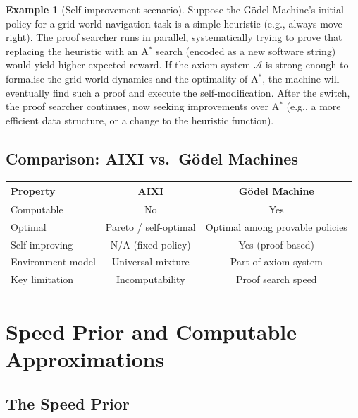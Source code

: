 \documentclass[11pt,a4paper]{article}
\theoremstyle{definition}
\newtheorem{example}[theorem]{Example}
\theoremstyle{remark}
\begin{document}
\begin{example}[Self-improvement scenario]
Suppose the G\"odel Machine's initial policy for a grid-world navigation
task is a simple heuristic (e.g., always move right).  The proof searcher
runs in parallel, systematically trying to prove that replacing the heuristic
with an A$^*$ search (encoded as a new software string) would yield higher
expected reward.  If the axiom system $\mathcal{A}$ is strong enough to
formalise the grid-world dynamics and the optimality of A$^*$, the machine
will eventually find such a proof and execute the self-modification.
After the switch, the proof searcher continues, now seeking improvements
over A$^*$ (e.g., a more efficient data structure, or a change to the
heuristic function).
\end{example}

\subsection{Comparison: AIXI vs.\ G\"odel Machines}

\begin{center}
\begin{tabular}{lcc}
\toprule
\textbf{Property} & \textbf{AIXI} & \textbf{G\"odel Machine} \\
\midrule
Computable & No & Yes \\
Optimal & Pareto / self-optimal & Optimal among provable policies \\
Self-improving & N/A (fixed policy) & Yes (proof-based) \\
Environment model & Universal mixture & Part of axiom system \\
Key limitation & Incomputability & Proof search speed \\
\bottomrule
\end{tabular}
\end{center}

\section{Speed Prior and Computable Approximations}\label{sec:speed}

\subsection{The Speed Prior}
\end{document}

